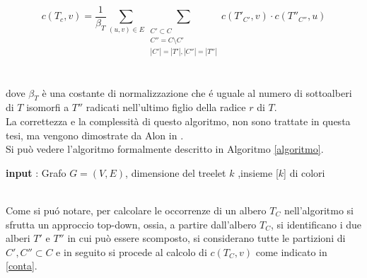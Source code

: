 \begin{equation}\label{conta}
	c(T_c,v)=\frac{1}{\beta_T}\sum_{(u,v)\in E}\sum_{\substack{C' \subset C \\C'' = C \setminus C' \\ |C'|=|T'|, |C''| = |T''|}}c(T'_{C'},v)\cdot c(T''_{C''},u)
\end{equation}\mbox{}\\\\
dove $ \beta_T $ \`e una costante di normalizzazione che \'e uguale al numero di sottoalberi di $ T $ isomorfi a $ T'' $ radicati nell'ultimo figlio della radice $ r $ di $ T $.\\
 La correttezza e la complessit\`a di questo algoritmo, non sono trattate in questa tesi, ma vengono dimostrate da Alon in \cite{alon1995color}.\\
 Si pu\`o vedere l'algoritmo formalmente  descritto in Algoritmo \ref{algoritmo}.\mbox{}\\


\begin{algorithm}[H]
	\label{algoritmo}
	\SetAlgoLined
	\caption{Fase di costruzione}
 	\textbf{input} : Grafo $ G =(V,E) $, dimensione del treelet $ k $ ,insieme [$ k $] di colori\;	
 			
\end{algorithm}\mbox{}\\

Come si pu\'o notare, per calcolare le occorrenze di un albero $ T_C $ nell'algoritmo si sfrutta un approccio top-down, ossia, a partire dall'albero $ T_C $, si identificano i due alberi $ T' $ e $ T'' $ in cui pu\`o essere scomposto, si considerano tutte le partizioni di $ C',C'' \subset C $ e in seguito si procede al calcolo di $ c(T_C,v) $ come indicato in \eqref{conta}.

